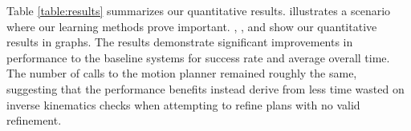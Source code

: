 Table \ref{table:results} summarizes our quantitative results.  illustrates a scenario where
our learning methods prove important. , , and  show our quantitative
results in graphs. The results demonstrate significant improvements in performance to the baseline systems for success rate and
average overall time. The number of calls to the motion planner remained roughly the same,
suggesting that the performance benefits instead derive from less time wasted on inverse kinematics checks when
attempting to refine plans with no valid refinement.
